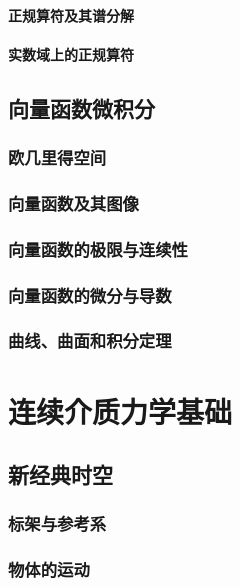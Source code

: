 \documentclass[zihao=-4,linespread=1.5,a4paper,heading=true,twoside]{ctexbook}
\theoremstyle{definition}
\theoremstyle{plain}
\begin{document}
\subsection{正规算符及其谱分解}\label{sec:II.2.4.4}

\subsection{实数域上的正规算符}\label{sec:II.2.4.5}

\chapter{向量函数微积分}
\section{欧几里得空间}


\section{向量函数及其图像}


\section{向量函数的极限与连续性}


\section{向量函数的微分与导数}


\section{曲线、曲面和积分定理}


\part{连续介质力学基础}
\chapter{新经典时空}
\section{标架与参考系}


\section{物体的运动}

\end{document}
